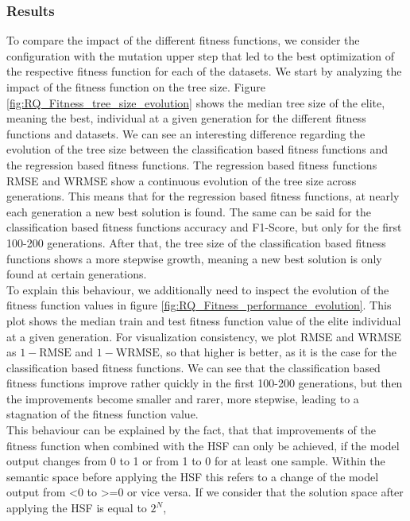 \documentclass[manuscript, review, anonymous]{acmart} %
\begin{document}
\subsubsection{Results}
To compare the impact of the different fitness functions, 
we consider the configuration with the mutation upper step that
led to the best optimization
of the respective fitness function for each of the datasets.
We start by analyzing the impact of the fitness function
on the tree size.
Figure \ref{fig:RQ_Fitness_tree_size_evolution} shows the median tree size of the elite,
meaning the best, individual at a given generation
for the different fitness functions and datasets. %
We can see an interesting difference regarding the evolution of the tree size between the 
classification based fitness functions and the regression based fitness functions.
The regression based fitness functions RMSE and WRMSE show a continuous evolution of the tree size across generations.
This means that for the regression based fitness functions, at
nearly each generation a new best solution is found.
The same can be said for the classification based fitness functions accuracy and F1-Score, 
but only for the first 100-200 generations. After that, the tree size of the classification based 
fitness functions shows a more stepwise growth,
meaning a new best solution is only found at certain generations.\\
To explain this behaviour, we additionally need to inspect the evolution of the 
fitness function values in figure \ref{fig:RQ_Fitness_performance_evolution}.
This plot shows the median train and test fitness function value of the elite individual at a given generation.
For visualization consistency, we plot RMSE and WRMSE as $1 - \text{RMSE}$ and $1 - \text{WRMSE}$, so that higher is better,
as it is the case for the classification based fitness functions.
We can see that the classification based fitness functions improve rather quickly in the first 100-200 generations,
but then the improvements become smaller and rarer, more stepwise, leading to a stagnation of the fitness function value.\\
This behaviour can be explained by the fact, that that
improvements of the fitness function when combined with the HSF
can only be achieved, if the model output changes from
0 to 1 or from 1 to 0 for at
least one sample.
Within the semantic space before applying the HSF this refers
to
a change of the model output from <0 to >=0
or vice versa. If we consider that the solution space after applying the HSF is equal to $2^{N}$,
\end{document}
